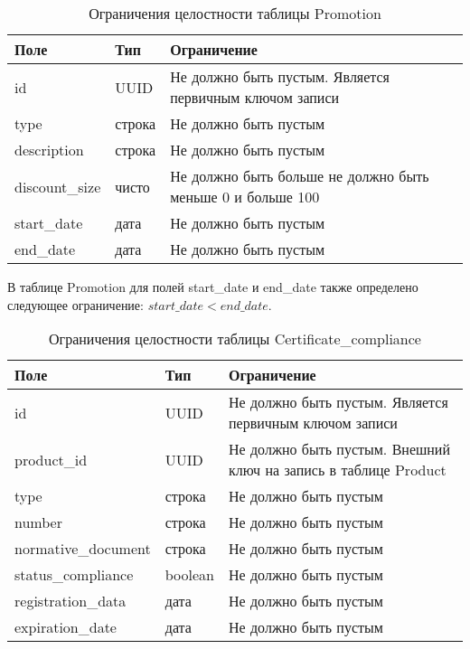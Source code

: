 \clearpage

\begin{table}[!h]
	\begin{center}
		\begin{threeparttable}
			\caption{Ограничения целостности таблицы Promotion}
			\label{tbl:entity_promotion}
			\begin{tabular}{|p{4.5cm}|p{2.5cm}|p{8.5cm}|}
				\hline 
				\textbf{Поле} & \textbf{Тип} & \textbf{Ограничение}  \\
				\hline
				id & UUID & Не должно быть пустым. Является первичным ключом записи  \\
				\hline
				type & строка & Не должно быть пустым  \\
				\hline
				description & строка & Не должно быть пустым  \\
				\hline
				discount\_size & чисто & Не должно быть больше не должно быть меньше 0 и больше 100 \\
				\hline
				start\_date & дата & Не должно быть пустым \\
				\hline
				end\_date & дата & Не должно быть пустым \\
				\hline
			\end{tabular}
		\end{threeparttable}			
	\end{center}
\end{table}

В таблице Promotion для полей start\_date и end\_date также определено следующее ограничение: $ start\_date < end\_date $.

\begin{table}[!h]
	\begin{center}
		\begin{threeparttable}
			\caption{Ограничения целостности таблицы Certificate\_compliance}
			\label{tbl:entity_сertificate_compliance}
			\begin{tabular}{|p{4.5cm}|p{2.5cm}|p{8.5cm}|}
				\hline 
				\textbf{Поле} & \textbf{Тип} & \textbf{Ограничение}  \\
				\hline
				id & UUID & Не должно быть пустым. Является первичным ключом записи  \\
				\hline
				product\_id & UUID & Не должно быть пустым. Внешний ключ на запись в таблице Product  \\
				\hline
				type & строка & Не должно быть пустым  \\
				\hline
				number & строка & Не должно быть пустым  \\
				\hline
				normative\_document & строка & Не должно быть пустым  \\
				\hline
				status\_compliance & boolean & Не должно быть пустым  \\
				\hline
				registration\_data & дата & Не должно быть пустым  \\
				\hline
				expiration\_date & дата & Не должно быть пустым  \\
				\hline
			\end{tabular}
		\end{threeparttable}			
	\end{center}
\end{table}

